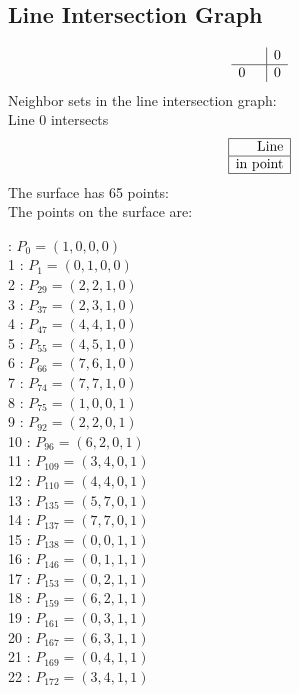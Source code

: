 \documentclass{article}
\begin{document}
{\subsection*{Line Intersection Graph}
{\arraycolsep=1pt
$$
\begin{array}{rr|*{1}r}
 &  & 0\\
\hline
0 &  & 0\\
\end{array}
$$
}%
Neighbor sets in the line intersection graph:\\
Line 0 intersects 
$$
\begin{array}{|r*{0}{|c}|}
\hline
\mbox{Line} \\
\hline
\mbox{in point} \\
\hline
\end{array}
$$
The surface has 65 points:\\
The points on the surface are:\\
\begin{multicols}{3}
 : $P_{0}=( 1, 0, 0, 0 )$\\
1 : $P_{1}=( 0, 1, 0, 0 )$\\
2 : $P_{29}=( 2, 2, 1, 0 )$\\
3 : $P_{37}=( 2, 3, 1, 0 )$\\
4 : $P_{47}=( 4, 4, 1, 0 )$\\
5 : $P_{55}=( 4, 5, 1, 0 )$\\
6 : $P_{66}=( 7, 6, 1, 0 )$\\
7 : $P_{74}=( 7, 7, 1, 0 )$\\
8 : $P_{75}=( 1, 0, 0, 1 )$\\
9 : $P_{92}=( 2, 2, 0, 1 )$\\
10 : $P_{96}=( 6, 2, 0, 1 )$\\
11 : $P_{109}=( 3, 4, 0, 1 )$\\
12 : $P_{110}=( 4, 4, 0, 1 )$\\
13 : $P_{135}=( 5, 7, 0, 1 )$\\
14 : $P_{137}=( 7, 7, 0, 1 )$\\
15 : $P_{138}=( 0, 0, 1, 1 )$\\
16 : $P_{146}=( 0, 1, 1, 1 )$\\
17 : $P_{153}=( 0, 2, 1, 1 )$\\
18 : $P_{159}=( 6, 2, 1, 1 )$\\
19 : $P_{161}=( 0, 3, 1, 1 )$\\
20 : $P_{167}=( 6, 3, 1, 1 )$\\
21 : $P_{169}=( 0, 4, 1, 1 )$\\
22 : $P_{172}=( 3, 4, 1, 1 )$\\

\end{multicols}}
\end{document}

